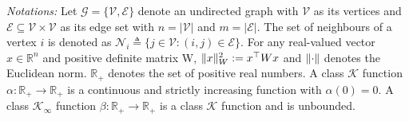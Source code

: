 \textit{Notations:} %
Let $\mathcal{G} = \{ \mathcal{V}, \mathcal{E}\}$ denote an undirected graph with $\mathcal{V}$ as its vertices and $\mathcal{E} \subseteq \mathcal{V}\times\mathcal{V}$ as its edge set with $n = |\mathcal{V}|$ and $m = |\mathcal{E}|$. The set of neighbours of a vertex $i$ is denoted as $\mathcal{N}_i \triangleq \{j\in \mathcal{V}:(i,j)\in \mathcal{E} \}$. For any real-valued vector $x \in \mathbb{R}^n$  and positive definite matrix W, $\lVert x\rVert_{W}^2 := x^\top Wx$ and $\lVert \cdot \rVert$ denotes the Euclidean norm. $\mathbb{R}_{+}$ denotes the set of positive real numbers. A class $\mathcal{K}$ function $\alpha: \mathbb{R}_+ \rightarrow \mathbb{R}_+$ is a continuous and strictly increasing function with $\alpha(0) = 0$. A class $\mathcal{K}_\infty$ function $\beta: \mathbb{R}_+ \rightarrow \mathbb{R}_+$ is a class $\mathcal{K}$ function and is unbounded.
